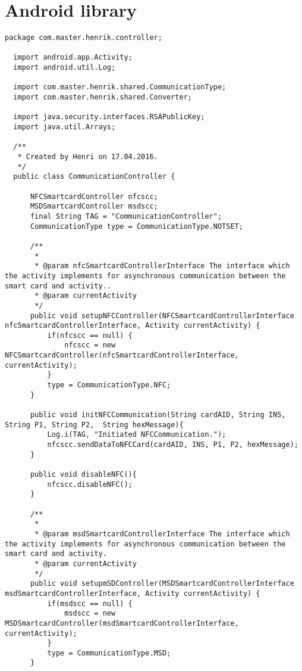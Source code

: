 \chapter{Android library}
\label{app:b}
\begin{lstlisting}[caption=CommunicationController.java.,breaklines=true,breakatwhitespace=false, label=lst:CommunicationController,escapechar=å]
  package com.master.henrik.controller;

  import android.app.Activity;
  import android.util.Log;

  import com.master.henrik.shared.CommunicationType;
  import com.master.henrik.shared.Converter;

  import java.security.interfaces.RSAPublicKey;
  import java.util.Arrays;

  /**
   * Created by Henri on 17.04.2016.
   */
  public class CommunicationController {

      NFCSmartcardController nfcscc;
      MSDSmartcardController msdscc;
      final String TAG = "CommunicationController";
      CommunicationType type = CommunicationType.NOTSET;

      /**
       *
       * @param nfcSmartcardControllerInterface The interface which the activity implements for asynchronous communication between the smart card and activity..
       * @param currentActivity
       */
      public void setupNFCController(NFCSmartcardControllerInterface nfcSmartcardControllerInterface, Activity currentActivity) {
          if(nfcscc == null) {
              nfcscc = new NFCSmartcardController(nfcSmartcardControllerInterface, currentActivity);
          }
          type = CommunicationType.NFC;
      }

      public void initNFCCommunication(String cardAID, String INS, String P1, String P2,  String hexMessage){
          Log.i(TAG, "Initiated NFCCommunication.");
          nfcscc.sendDataToNFCCard(cardAID, INS, P1, P2, hexMessage);
      }

      public void disableNFC(){
          nfcscc.disableNFC();
      }

      /**
       *
       * @param msdSmartcardControllerInterface The interface which the activity implements for asynchronous communication between the smart card and activity.
       * @param currentActivity
       */
      public void setupmSDController(MSDSmartcardControllerInterface msdSmartcardControllerInterface, Activity currentActivity) {
          if(msdscc == null) {
              msdscc = new MSDSmartcardController(msdSmartcardControllerInterface, currentActivity);
          }
          type = CommunicationType.MSD;
      }


\end{lstlisting}
